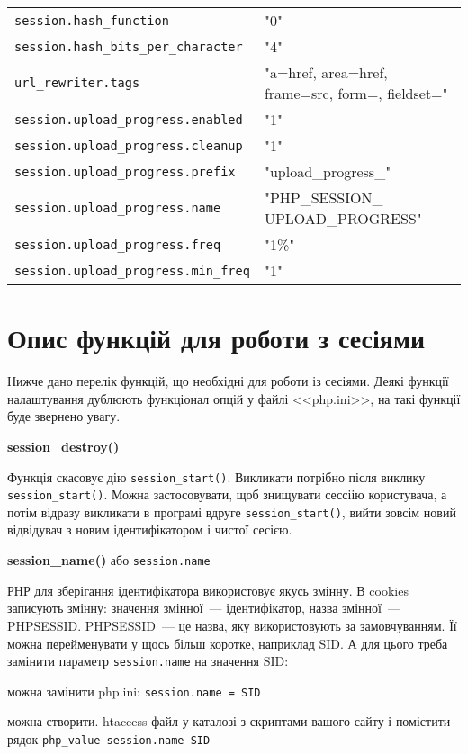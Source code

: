 \begin{longtable}[t]{|l|p{15em}|}
\verb'session.hash_function' & "0"\\
\verb'session.hash_bits_per_character' & "4"\\
\verb'url_rewriter.tags' & "a=href, area=href, frame=src, form=, fieldset="\\
\verb'session.upload_progress.enabled' & "1"\\
\verb'session.upload_progress.cleanup' & "1"\\
\verb'session.upload_progress.prefix' & "upload\_progress\_"\\
\verb'session.upload_progress.name' & "PHP\_SESSION\_ UPLOAD\_PROGRESS"\\
\verb'session.upload_progress.freq' & "1\%"\\
\verb'session.upload_progress.min_freq' & "1"\\


\hline
\end{longtable}


\section{Опис функцій для роботи з сесіями}
\label{ses-func:text}
Нижче дано перелік функцій, що необхідні для роботи із сесіями. Деякі функції налаштування дублюють функціонал опцій у файлі <<php.ini>>, на такі функції буде звернено увагу.

\textbf{session\_destroy()}

Функція скасовує дію \verb'session_start()'. Викликати потрібно після виклику \verb'session_start()'. Можна застосовувати, щоб знищувати сессіію користувача, а потім відразу викликати в програмі вдруге \verb'session_start()', вийти зовсім новий відвідувач з новим ідентифікатором і чистої сесією.

\textbf{session\_name()} або \verb'session.name'

РНР для зберігання ідентифікатора використовує якусь змінну. В cookies записують змінну: значення змінної~--- ідентифікатор, назва змінної~--- PHPSESSID. PHPSESSID~--- це назва, яку використовують за замовчуванням. Її можна перейменувати у щось більш коротке, наприклад SID. А для цього треба замінити параметр \verb'session.name' на значення SID: 

можна замінити php.ini: \verb'session.name = SID' 

можна створити. htaccess файл у каталозі з скриптами вашого сайту і помістити рядок \verb'php_value session.name SID'

